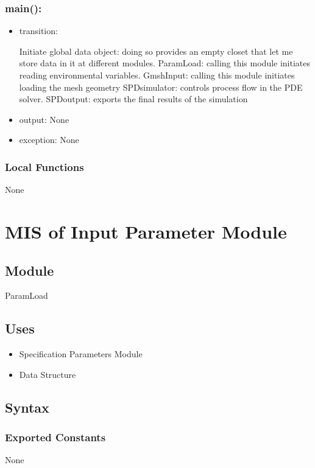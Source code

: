 \documentclass[12pt, titlepage]{article}
\begin{document}
\subsubsection*{main():}
\begin{itemize}
\item transition:

\subitem Initiate global data object: doing so provides an empty closet that let me store data in it at different modules.  
\subitem ParamLoad: calling this module initiates reading environmental variables.
\subitem GmshInput: calling this module initiates loading the mesh geometry
\subitem SPDsimulator: controls process flow in the PDE solver. 
\subitem SPDoutput: exports the final results of the simulation
\item output: None
\item exception: None
\end{itemize}


\subsubsection{Local Functions}

None

\newpage
%
%
%
%
%
\section{MIS of Input Parameter Module} \label{ICM}  
	
\subsection{Module}
ParamLoad

\subsection{Uses}
\begin{itemize}
	\item Specification Parameters Module
	\item Data Structure 

\end{itemize}

\subsection{Syntax}

\subsubsection{Exported Constants}
None
\end{document}
